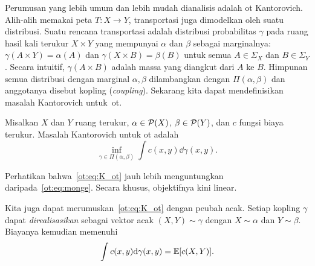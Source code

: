 Perumusan yang lebih umum dan lebih mudah dianalisis adalah \gls{ot} Kantorovich. Alih-alih memakai peta $T:X\rightarrow Y$, transportasi juga dimodelkan oleh suatu distribusi. Suatu rencana transportasi adalah distribusi probabilitas $\gamma$ pada ruang hasil kali terukur $X\times Y$ yang mempunyai $\alpha$ dan $\beta$ sebagai marginalnya: $\gamma(A\times Y)=\alpha(A)$ dan $\gamma(X\times B)=\beta(B)$ untuk semua $A\in\Sigma_X$ dan $B\in\Sigma_Y$. Secara intuitif, $\gamma(A\times B)$ adalah massa yang diangkut dari $A$ ke $B$. Himpunan semua distribusi dengan marginal $\alpha,\beta$ dilambangkan dengan $\Pi(\alpha,\beta)$ dan anggotanya disebut kopling (\emph{coupling}). Sekarang kita dapat mendefinisikan masalah Kantorovich untuk~\gls{ot}.
\begin{defn}
    Misalkan $X$ dan $Y$ ruang terukur, $\alpha\in\mathcal{P}(X)$, $\beta\in\mathcal{P}(Y)$, dan $c$ fungsi biaya terukur. Masalah Kantorovich untuk \gls{ot} adalah
    \begin{equation}\label{ot:eq:K_ot}
        \inf_{\gamma\in\Pi(\alpha,\beta)}
        \int c(x,y)\dd\gamma(x,y).
    \end{equation}
\end{defn}
Perhatikan bahwa~\eqref{ot:eq:K_ot} jauh lebih menguntungkan daripada~\eqref{ot:eq:monge}. Secara khusus, objektifnya kini linear.

\begin{rem}
    Kita juga dapat merumuskan~\eqref{ot:eq:K_ot} dengan peubah acak. Setiap kopling $\gamma$ dapat \emph{direalisasikan} sebagai vektor acak $(X,Y)\sim\gamma$ dengan $X\sim\alpha$ dan $Y\sim\beta$. Biayanya kemudian memenuhi
    \begin{equation}
        \int c(x,y)\mathrm{d}\gamma(x,y)=\mathbb{E}[c(X,Y)].
    \end{equation}
\end{rem}

